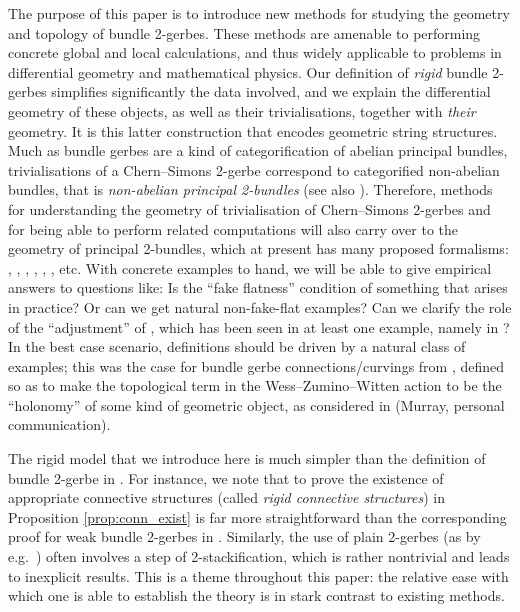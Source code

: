 \documentclass[12pt]{amsart}
\theoremstyle{plain}
\theoremstyle{definition}
\theoremstyle{remark}
\numberwithin{equation}{section}
\newcommand{\<}{\langle}
\renewcommand{\>}{\rangle}
\begin{document}
The purpose of this paper is to introduce new methods for studying the geometry and topology of bundle 2-gerbes. 
These methods are amenable to performing concrete global and local calculations, and thus widely applicable to problems in differential geometry and mathematical physics. 
Our definition of \emph{rigid} bundle 2-gerbes simplifies significantly the data involved, and we explain the differential geometry of these objects, as well as their trivialisations, together with \emph{their} geometry. 
It is this latter construction that encodes geometric string structures.
Much as bundle gerbes are a kind of categorification of abelian principal bundles, trivialisations of a Chern--Simons 2-gerbe correspond to categorified non-abelian bundles, that is \emph{non-abelian principal 2-bundles} \cite{Bartels} (see also \cite{Nikolaus-Waldorf_13}).
Therefore, methods for understanding the geometry of trivialisation of Chern--Simons 2-gerbes and for being able to perform related computations will also carry over to the geometry of principal 2-bundles, which at present has many proposed formalisms: \cite{B_M}, \cite{ACJ}, \cite{BS04}, \cite{Schreiber-Waldorf_13}, \cite{Waldorf_18}, \cite{Kim-Saemann_20,RSW_22}, etc. 
With concrete examples to hand, we will be able to give empirical answers to questions like: Is the ``fake flatness'' condition of \cite{BS04} something that arises in practice? Or can we get natural non-fake-flat examples? 
Can we clarify the role of the ``adjustment'' of \cite{Kim-Saemann_20}, which has been seen in at least one example, namely in \cite{RSW_22}? 
In the best case scenario, definitions should be driven by a natural class of examples; this was the case for bundle gerbe connections/curvings from \cite{Mur}, defined so as to make the topological term in the Wess--Zumino--Witten action to be the ``holonomy'' of some kind of geometric object, as considered in \cite{Carey-Murray_86} (Murray, personal communication).

\medskip

The rigid model that we introduce here is much simpler than the definition of bundle 2-gerbe in \cite{StevPhD}. 
For instance, we note that to prove the existence of appropriate connective structures (called \emph{rigid connective structures}) in Proposition \ref{prop:conn_exist} is far more straightforward than the corresponding proof for weak bundle 2-gerbes in \cite[Proposition 10.1]{StevPhD}. Similarly, the use of plain 2-gerbes (as by e.g.\ \cite{BM}) often involves a step of 2-stackification, which is rather nontrivial and leads to inexplicit results.
This is a theme throughout this paper: the relative ease with which one is able to establish the theory is in stark contrast to existing methods. 
\end{document}
